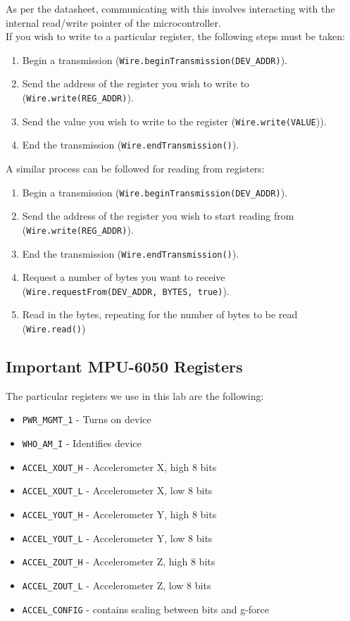 \documentclass{article}
\begin{document}
        As per the datasheet, communicating with this involves interacting with the internal read/write pointer of the microcontroller. \\
        
        \noindent If you wish to write to a particular register, the following steps must be taken:
        \begin{enumerate}
            \item Begin a transmission (\texttt{Wire.beginTransmission(DEV\_ADDR)}).
            \item Send the address of the register you wish to write to (\texttt{Wire.write(REG\_ADDR)}).
            \item Send the value you wish to write to the register (\texttt{Wire.write(VALUE})).
            \item End the transmission (\texttt{Wire.endTransmission()}).
        \end{enumerate}
        \noindent A similar process can be followed for reading from registers:
        \begin{enumerate}
            \item Begin a transmission (\texttt{Wire.beginTransmission(DEV\_ADDR)}).
            \item Send the address of the register you wish to start reading from (\texttt{Wire.write(REG\_ADDR)}).
            \item End the transmission (\texttt{Wire.endTransmission()}).
            \item Request a number of bytes you want to receive (\texttt{Wire.requestFrom(DEV\_ADDR, BYTES, true)}).
            \item Read in the bytes, repeating for the number of bytes to be read (\texttt{Wire.read()})
        \end{enumerate}
    \subsection{Important MPU-6050 Registers}\label{registers}
        The particular registers we use in this lab are the following: 
        \begin{itemize}
            \item \texttt{PWR\_MGMT\_1} - Turns on device
            \item \texttt{WHO\_AM\_I} - Identifies device
            \item \texttt{ACCEL\_XOUT\_H} - Accelerometer X, high 8 bits 
            \item \texttt{ACCEL\_XOUT\_L} - Accelerometer X, low 8 bits 
            \item \texttt{ACCEL\_YOUT\_H} - Accelerometer Y, high 8 bits
            \item \texttt{ACCEL\_YOUT\_L} - Accelerometer Y, low 8 bits 
            \item \texttt{ACCEL\_ZOUT\_H} - Accelerometer Z, high 8 bits
            \item \texttt{ACCEL\_ZOUT\_L} - Accelerometer Z, low 8 bits 
            \item \texttt{ACCEL\_CONFIG} - contains scaling between bits and g-force
        \end{itemize}
        
\end{document}
